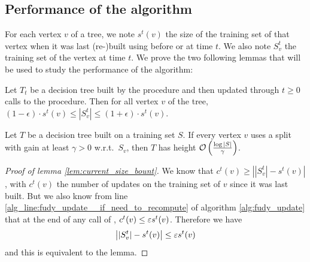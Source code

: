 \subsection{Performance of the \algo{} algorithm}
For each vertex $v$ of a tree, we note $s^t(v)$ the size of the training set of that vertex when it was last (re-)built using \AlgoBuild{} before or at time $t$. We also note $S^t_v$ the training set of the vertex at time $t$. We prove the two following lemmas that will be used to study the performance of the algorithm:
\begin{lemma}\label{lem:current_size_bount}
Let $T_t$ be a decision tree built by the \AlgoBuild{} procedure and then updated through $t \geq 0$ calls to the \AlgoUpdate{} procedure. Then for all vertex $v$ of the tree, $(1-\epsilon) \cdot s^t(v) \leq |S^t_v| \leq (1+\epsilon) \cdot  s^t(v)$.
\end{lemma}
\begin{lemma}\label{lem:height_bound}
Let $T$ be a decision tree built on a training set $S$. If every vertex $v$ uses a split with gain at least $\gamma > 0$ w.r.t.\ $S_v$, then $T$ has height  $\mathcal{O} \left(\frac{\log |S|}{\gamma}  \right)  $.
\end{lemma}
\begin{proof}[Proof of lemma \ref{lem:current_size_bount}]
    We know that $c^t(v) \geq \left||S^t_v| - s^t(v)\right|$, with $c^t(v)$ the number of updates on the training set of $v$ since it was last built. But we also know from line \ref{alg_line:fudy_update__if_need_to_recompute} of algorithm \ref{alg:fudy_update} that at the end of any call of \AlgoUpdate{}, $c^t(v) \leq \varepsilon s^t(v)$. Therefore we have
    \begin{equation*}
        \left||S^t_v| - s^t(v)\right| \leq \varepsilon s^t(v) 
    \end{equation*}
    and this is equivalent to the lemma.
\end{proof}

